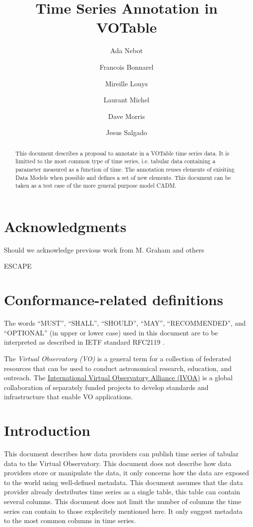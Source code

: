 \documentclass[11pt,a4paper]{ivoa}
\title{Time Series Annotation in VOTable}
\author[http://www.ivoa.net/twiki/bin/view/IVOA/AdaNebot]{Ada Nebot}
\author[http://www.ivoa.net/twiki/bin/view/IVOA/FrancoisBonnarel]{Francois Bonnarel}
\author[http://www.ivoa.net/twiki/bin/view/IVOA/MireilleLouys]{Mireille Louys}
\author[http://www.ivoa.net/twiki/bin/view/IVOA/LaurantMichel]{Laurant Michel}
\author[http://www.ivoa.net/twiki/bin/view/IVOA/DaveMorris]{Dave Morris}
\author[http://www.ivoa.net/twiki/bin/view/IVOA/JesusSalgado]{Jesus Salgado}
\begin{document}
\begin{abstract}
  This document describes a proposal to annotate in a VOTable time series data. It is limitted to the most common type of time series, i.e. tabular data containing a parameter measured as a function of time. The annotation reuses elements of exisiting Data Models when possible and defines a set of new elements. This document can be taken as a test case of the more general purpose model CADM. 
\end{abstract}

\section*{Acknowledgments}
Should we acknowledge previous work from M. Graham and others


ESCAPE

\section*{Conformance-related definitions}

The words ``MUST'', ``SHALL'', ``SHOULD'', ``MAY'', ``RECOMMENDED'', and
``OPTIONAL'' (in upper or lower case) used in this document are to be
interpreted as described in IETF standard RFC2119 \citep{std:RFC2119}.

The \emph{Virtual Observatory (VO)} is a
general term for a collection of federated resources that can be used
to conduct astronomical research, education, and outreach.
The \href{http://www.ivoa.net}{International
Virtual Observatory Alliance (IVOA)} is a global
collaboration of separately funded projects to develop standards and
infrastructure that enable VO applications.


\section{Introduction}
This document describes how data providers can publish time series of tabular data to the Virtual Observatory. This document does not describe how data providers store or manipulate the data, it only concerns how the data are exposed to the world using well-defined metadata. This document assumes that the data provider already destributes time series as a single table, this table can contain several columns. This document does not limit the number of columns the time series can contain to those explecitely mentioned here. It only suggest metadata to the most common columns in time series.  
\end{document}
